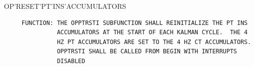 \begin{frame}
OP'RESET'PT'INS'ACCUMULATORS
\begin{verbatim}
     FUNCTION: THE OPPTRSTI SUBFUNCTION SHALL REINITIALIZE THE PT INS
               ACCUMULATORS AT THE START OF EACH KALMAN CYCLE.  THE 4
               HZ PT ACCUMULATORS ARE SET TO THE 4 HZ CT ACCUMULATORS.
               OPPTRSTI SHALL BE CALLED FROM BEGIN WITH INTERRUPTS
               DISABLED

\end{verbatim}
\end{frame}
